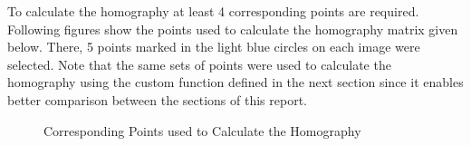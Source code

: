 \documentclass[a4paper,11pt]{article}%
\begin{document}
To calculate the homography at least 4 corresponding points are required. Following figures show the points used to calculate the homography matrix given below. There, 5 points marked in the light blue circles on each image were selected. Note that the same sets of points were used to calculate the homography using the custom function defined in the next section since it enables better comparison between the sections of this report. \\
 
\begin{figure}[!h]
	\centering
	\caption{Corresponding Points used to Calculate the Homography}
	
\end{figure}
 
\end{document}
